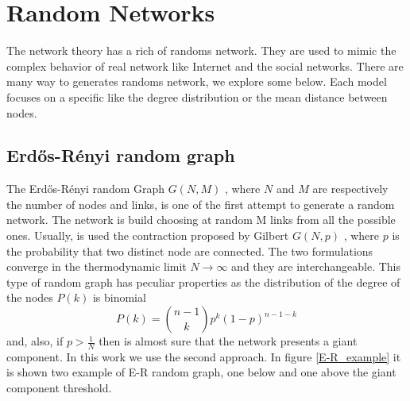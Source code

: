 \section{Random Networks}
The network theory has a rich of randoms network. They are used to mimic the complex behavior of real network like Internet and the social networks. There are many way to generates randoms network, we explore some below. Each model focuses on a specific like the degree distribution or the mean distance between nodes.

\subsection{Erd\H{o}s-Rényi random graph}

The Erd\H{o}s-Rényi random Graph $G(N,M)$ \cite{erdos-renyi1960}, where $N$ and $M$ are respectively the number of nodes and links, is one of the first attempt to generate a random network. The network is build choosing at random M links from all the possible ones. Usually, is used the contraction proposed by Gilbert $G(N,p)$ \cite{gilbert} , where $p$ is the probability that two distinct node are connected. The two formulations converge in the thermodynamic limit $N \rightarrow \infty$ and they are interchangeable.
This type of random graph has peculiar properties as the distribution of the degree of the nodes $P(k)$  is binomial
\begin{equation}
    P(k) = \binom{n-1}{k}p^k(1-p)^{n-1-k}
\end{equation} 
and, also, if $p > \frac{1}{N}$ then is almost sure that the network presents a giant component.
In this work we use the second approach. In figure \ref{E-R_example} it is shown two example of E-R random graph, one below and one above the giant component threshold.

